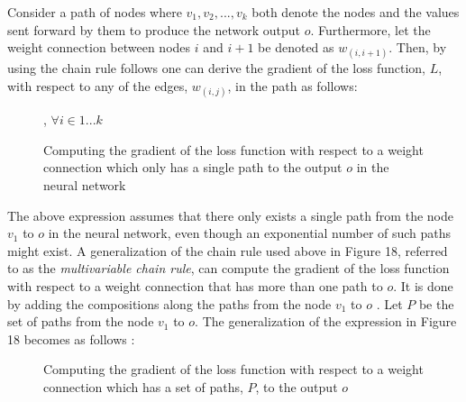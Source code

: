 \documentclass[titlepage]{article}
\begin{document}
\noindent
Consider a path of nodes where $v_{1}, v_{2}, ..., v_{k}$ both denote the nodes and the values sent forward by them to produce the network output $o$. Furthermore, let the weight connection between nodes $i$ and $i+1$ be denoted as $w_{(i, i+1)}$. Then, by using the chain rule follows \cite{charu} one can derive the gradient of the loss function, $L$, with respect to any of the edges, $w_{(i, j)}$, in the path as follows:

\vskip 0.3cm

\begin{figure}[h]
    \centerline{, $\forall i \in 1 ... k$}
    \vskip 0.3cm
    \caption{Computing the gradient of the loss function with respect to a weight connection which only has a single path to the output $o$ in the neural network}
\end{figure}

\newpage

\noindent
The above expression assumes that there only exists a single path from the node $v_{1}$ to $o$ in the neural network, even though an exponential number of such paths might exist. A generalization of the chain rule used above in Figure 18, referred to as the \emph{multivariable chain rule}, can compute the gradient of the loss function with respect to a weight connection that has more than one path to $o$. It is done by adding the compositions along the paths from the node $v_{1}$ to $o$ \cite{charu}. Let $P$ be the set of paths from the node $v_{1}$ to $o$. The generalization of the expression in Figure 18 becomes as follows \cite{charu}:

\vskip 0.3cm

\begin{figure}[h]
    \centerline{}
    \vskip 0.3cm
    \caption{Computing the gradient of the loss function with respect to a weight connection which has a set of paths, $P$, to the output $o$}
\end{figure}

\vskip 0.3cm
\end{document}
